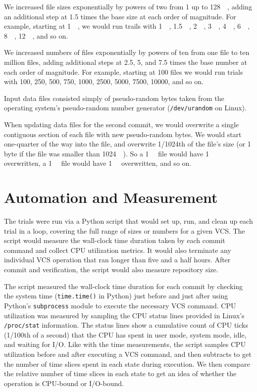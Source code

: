 We increased file sizes exponentially by powers of two from \SI{1}{\byte} up to
\SI{128}{\gibi\byte}, adding an additional step at \num{1.5} times the base size
at each order of magnitude. For example, starting at \SI{1}{\mebi\byte}, we
would run trails with \SI{1}{\mebi\byte}, \SI{1.5}{\mebi\byte},
\SI{2}{\mebi\byte}, \SI{3}{\mebi\byte}, \SI{4}{\mebi\byte}, \SI{6}{\mebi\byte},
\SI{8}{\mebi\byte}, \SI{12}{\mebi\byte}, and so on.

We increased numbers of files exponentially by powers of ten from one file to
ten million files, adding additional steps at \num{2.5}, \num{5}, and \num{7.5}
times the base number at each order of magnitude. For example, starting at
\num{100} files we would run trials with \num{100}, \num{250}, \num{500},
\num{750}, \num{1000}, \num{2500}, \num{5000}, \num{7500}, \num{10000}, and so
on.

Input data files consisted simply of pseudo-random bytes taken from the
operating system's pseudo-random number generator (\lstinline{/dev/urandom} on
Linux).

When updating data files for the second \gls{commit}, we would overwrite a
single contiguous section of each file with new pseudo-random bytes. We would
start one-quarter of the way into the file, and overwrite \num{1/1024}th of the
file's size (or 1 byte if the file was smaller than \SI{1024}{\kibi\byte}). So a
\SI{1}{\mebi\byte} file would have \SI{1}{\kibi\byte} overwritten, a
\SI{1}{\gibi\byte} file would have \SI{1}{\mebi\byte} overwritten, and so on.


\section{Automation and Measurement}

The trials were run via a Python script that would set up, run, and clean up
each trial in a loop, covering the full range of sizes or numbers for a given
\gls{VCS}. The script would measure the wall-clock time duration taken by each
\gls{commit} command and collect CPU utilization metrics. It would also
terminate any individual \gls{VCS} operation that ran longer than five and a
half hours. After \gls{commit} and verification, the script would also measure
repository size.

The script measured the wall-clock time duration for each \gls{commit} by
checking the system time (\lstinline{time.time()} in Python) just before and
just after using Python's \lstinline{subprocess} module to execute the necessary
\gls{VCS} command. CPU utilization was measured by sampling the CPU status lines
provided in Linux's \lstinline{/proc/stat} information. The status lines show a
cumulative count of CPU ticks (\num{1/100}{th} of a second) that the CPU has
spent in user mode, system mode, idle, and waiting for I/O\cite{proc_man_page}.
Like with the time measurements, the script samples CPU utilization before and
after executing a \gls{VCS} command, and then subtracts to get the number of
time slices spent in each state during execution. We then compare the relative
number of time slices in each state to get an idea of whether the operation is
CPU-bound or I/O-bound.

